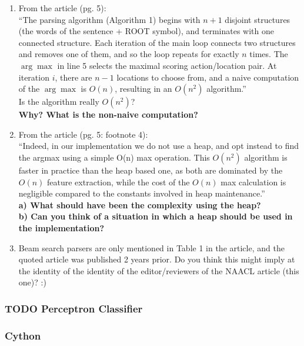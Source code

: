 \documentclass[11pt]{article}
\begin{document}
     
\begin{enumerate}
\item From the article (pg. 5): \\
``The parsing algorithm (Algorithm 1) begins with
   $n + 1$ disjoint structures (the words of the sentence +
   ROOT symbol), and terminates with one connected
   structure. Each iteration of the main loop connects
   two structures and removes one of them, and so the
   loop repeats for exactly $n$ times.
   The $\arg\max$ in line 5 selects the maximal scoring
   action/location pair. At iteration $i$, there are $n - 1$
   locations to choose from, and a naive computation of
   the $\arg\max$ is $O(n)$, resulting in an $O(n^{2})$ algorithm.''\\
   Is the algorithm really $O(n^{2})$? \\
   \textbf{Why? What is the non-naive computation?}
\item From the article (pg. 5: footnote 4): \\
``Indeed, in our implementation we do not use a heap, and
   opt instead to find the argmax using a simple O(n) max
   operation. This $O(n^2)$ algorithm is faster in practice than the heap 
   based one, as both are dominated by the $O(n)$ feature extraction,
   while the cost of the $O(n)$ max calculation is negligible 
   compared to the constants involved in heap maintenance.'' \\
   \textbf{a) What should have been the complexity using the heap?} \\
   \textbf{b) Can you think of a situation in which a heap should be used in the    implementation?}
\item Beam search parsers are only mentioned in Table 1 in the
   article, and the quoted article was published 2 years prior. Do you
   think this might imply at the identity of the identity of the
   editor/reviewers of the NAACL article (this one)? :)
\end{enumerate}

    
\subsubsection{\textbf{TODO} \label{Perceptron-Classifier}Perceptron Classifier}
\label{sec-7-2-5}

    
\subsubsection{\label{Cython}Cython}
\label{sec-7-2-6}
\end{document}
